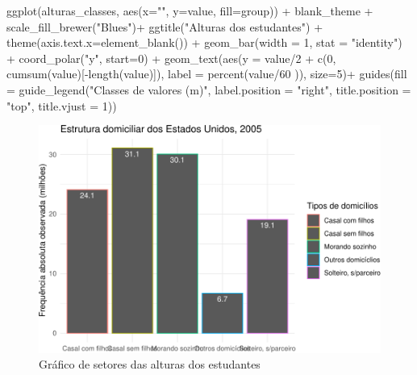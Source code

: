 \documentclass[
]{book}
\newenvironment{Shaded}{\begin{snugshade}}{\end{snugshade}}
\newcommand{\AttributeTok}[1]{\textcolor[rgb]{0.77,0.63,0.00}{#1}}
\newcommand{\DecValTok}[1]{\textcolor[rgb]{0.00,0.00,0.81}{#1}}
\newcommand{\FunctionTok}[1]{\textcolor[rgb]{0.00,0.00,0.00}{#1}}
\newcommand{\NormalTok}[1]{#1}
\newcommand{\SpecialCharTok}[1]{\textcolor[rgb]{0.00,0.00,0.00}{#1}}
\newcommand{\StringTok}[1]{\textcolor[rgb]{0.31,0.60,0.02}{#1}}
\begin{document}
\begin{Shaded}
\begin{Highlighting}[]
\FunctionTok{ggplot}\NormalTok{(alturas\_classes, }\FunctionTok{aes}\NormalTok{(}\AttributeTok{x=}\StringTok{""}\NormalTok{, }\AttributeTok{y=}\NormalTok{value, }\AttributeTok{fill=}\NormalTok{group)) }\SpecialCharTok{+}
\NormalTok{  blank\_theme }\SpecialCharTok{+}
  \FunctionTok{scale\_fill\_brewer}\NormalTok{(}\StringTok{"Blues"}\NormalTok{)}\SpecialCharTok{+}
  \FunctionTok{ggtitle}\NormalTok{(}\StringTok{"Alturas dos estudantes"}\NormalTok{) }\SpecialCharTok{+}
  \FunctionTok{theme}\NormalTok{(}\AttributeTok{axis.text.x=}\FunctionTok{element\_blank}\NormalTok{()) }\SpecialCharTok{+}
  \FunctionTok{geom\_bar}\NormalTok{(}\AttributeTok{width =} \DecValTok{1}\NormalTok{, }\AttributeTok{stat =} \StringTok{"identity"}\NormalTok{) }\SpecialCharTok{+}
  \FunctionTok{coord\_polar}\NormalTok{(}\StringTok{"y"}\NormalTok{, }\AttributeTok{start=}\DecValTok{0}\NormalTok{) }\SpecialCharTok{+}
  \FunctionTok{geom\_text}\NormalTok{(}\FunctionTok{aes}\NormalTok{(}\AttributeTok{y =}\NormalTok{ value}\SpecialCharTok{/}\DecValTok{2} \SpecialCharTok{+} \FunctionTok{c}\NormalTok{(}\DecValTok{0}\NormalTok{, }\FunctionTok{cumsum}\NormalTok{(value)[}\SpecialCharTok{{-}}\FunctionTok{length}\NormalTok{(value)]),}
                \AttributeTok{label =} \FunctionTok{percent}\NormalTok{(value}\SpecialCharTok{/}\DecValTok{60}\NormalTok{ )), }\AttributeTok{size=}\DecValTok{5}\NormalTok{)}\SpecialCharTok{+}
  \FunctionTok{guides}\NormalTok{(}\AttributeTok{fill =} \FunctionTok{guide\_legend}\NormalTok{(}\StringTok{"Classes de valores (m)"}\NormalTok{,}
                             \AttributeTok{label.position =} \StringTok{"right"}\NormalTok{,}
                             \AttributeTok{title.position =} \StringTok{"top"}\NormalTok{, }\AttributeTok{title.vjust =} \DecValTok{1}\NormalTok{)) }
\end{Highlighting}
\end{Shaded}

\begin{figure}
\centering
\includegraphics{apostila_files/figure-latex/unnamed-chunk-47-1.pdf}
\caption{\label{fig:unnamed-chunk-47}Gráfico de setores das alturas dos estudantes}
\end{figure}
\end{document}
